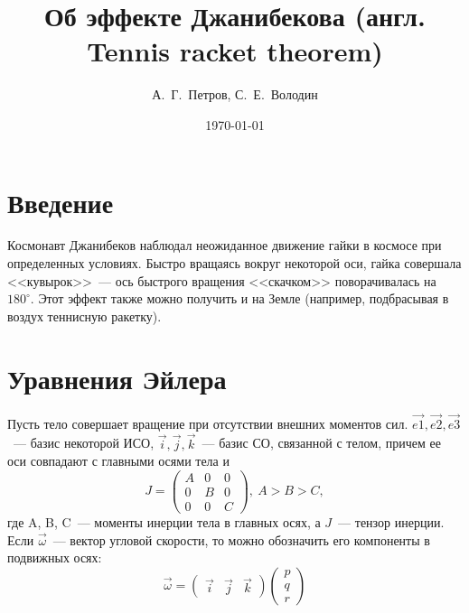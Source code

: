 \documentclass{article}
\title{Об эффекте Джанибекова (англ. Tennis racket theorem)}
\date{\today}
\author{А.~Г.~Петров, С.~Е.~Володин}
\newcommand{\degree}{^{\circ}}
\begin{document}
\maketitle
\section{Введение}
Космонавт Джанибеков наблюдал неожиданное движение гайки в космосе при определенных условиях. Быстро вращаясь вокруг некоторой оси, гайка совершала <<кувырок>>~--- ось быстрого вращения <<скачком>> поворачивалась на \begin{math} 180\degree \end{math}. Этот эффект также можно получить и на Земле (например, подбрасывая в воздух теннисную ракетку).
\section{Уравнения Эйлера}
Пусть тело совершает вращение при отсутствии внешних моментов сил.
\begin{math}
\vec{e1}, \vec{e2}, \vec{e3}
\end{math}~--- базис некоторой ИСО,
\begin{math}
\vec{i}, \vec{j}, \vec{k}
\end{math}~--- базис СО, связанной с телом, причем ее оси совпадают с главными осями тела и
\begin{equation}
J=\left( \begin{array}{lcr} A & 0 & 0\\ 0 & B & 0\\ 0 & 0 & C \end{array} \right),\ A > B > C,
\end{equation}
где A, B, C~--- моменты инерции тела в главных осях, а \begin{math} J \end{math}~--- тензор инерции. Если \begin{math} \vec{\omega} \end{math}~--- вектор угловой скорости, то можно обозначить его компоненты в подвижных осях:
\begin{equation}
\vec{\omega}=
\left( \begin{array}{lcr} \vec{i} & \vec{j} & \vec{k} \end{array} \right)
\left( \begin{array}{lcr} p\\q\\r \end{array} \right)
\end{equation}
\end{document}
